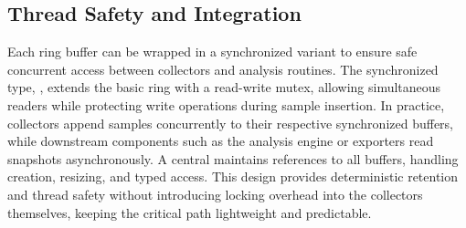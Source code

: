 \subsection{Thread Safety and Integration}
\label{subsec:ringbuffer_sync}

Each ring buffer can be wrapped in a synchronized variant to ensure safe concurrent access between collectors and analysis routines.  
The synchronized type, , extends the basic ring with a read-write mutex, allowing simultaneous readers while protecting write operations during sample insertion.  
In practice, collectors append samples concurrently to their respective synchronized buffers, while downstream components such as the analysis engine or exporters read snapshots asynchronously.  
A central  maintains references to all buffers, handling creation, resizing, and typed access.  
This design provides deterministic retention and thread safety without introducing locking overhead into the collectors themselves, keeping the critical path lightweight and predictable.